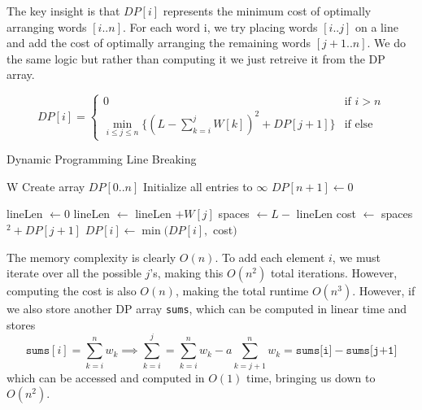  \begin{algo}
    The key insight is that $DP[i]$ represents the minimum cost of optimally arranging words $[i..n]$. For each word i, we try placing words $[i..j]$ on a line and add the cost of optimally arranging the remaining words $[j+1..n]$. We do the same logic but rather than computing it we just retreive it from the DP array. 

    \begin{equation}
      DP[i] = 
      \begin{cases}
        0 & \text{if } i > n \\
        \min_{i \leq j \leq n} \big\{ (L - \sum_{k=i}^j W[k])^2 + DP[j+1] \big\} & \text{if else} 
      \end{cases}
    \end{equation}


    \begin{algorithm}[H]
      \caption{Dynamic Programming Line Breaking}
      \label{alg:dpline}
      \begin{algorithmic}
        \State W
          \State Create array $DP[0..n]$ 
          \State Initialize all entries to $\infty$
          \State $DP[n+1] \gets 0$ 
          
            
            \State lineLen $\gets 0$
              
              \State lineLen $\gets$ lineLen $+ W[j]$
                
                \State spaces $\gets L -$ lineLen 
                \State cost $\gets$ spaces$^2 + DP[j+1]$ 
                \State $DP[i] \gets \min(DP[i],$ cost$)$ 
              \EndIf
            \EndFor
          \EndFor
          
          \State {}  
        \EndFunction
      \end{algorithmic}
    \end{algorithm}

    The memory complexity is clearly $O(n)$. To add each element $i$, we must iterate over all the possible $j$'s, making this $O(n^2)$ total iterations. However, computing the cost is also $O(n)$, making the total runtime $O(n^3)$. However, if we also store another DP array \texttt{sums}, which can be computed in linear time and stores 
    \begin{equation}
      \texttt{sums}[i] = \sum_{k=i}^n w_k \implies \sum_{k=i}^{j}  = \sum_{k=i}^n w_k - a\sum_{k=j+1}^n w_k = \texttt{sums[i]} - \texttt{sums[j+1]}
    \end{equation}
    which can be accessed and computed in $O(1)$ time, bringing us down to $O(n^2)$. 
  \end{algo}

